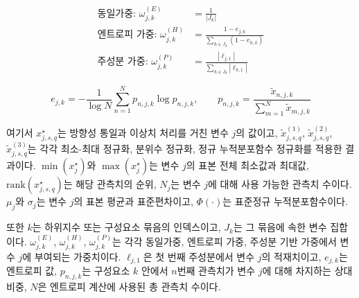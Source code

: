 \documentclass[11pt,a4paper]{report}
\begin{document}
\begin{align}
\text{동일가중: } \omega_{j,k}^{(E)} &= \frac{1}{|J_k|} \\
\text{엔트로피 가중: } \omega_{j,k}^{(H)} &= \frac{1-e_{j,k}}{\sum_{h \in J_k}(1-e_{h,k})} \\
\text{주성분 가중: } \omega_{j,k}^{(P)} &= \frac{|\ell_{j,1}|}{\sum_{h \in J_k}|\ell_{h,1}|} \label{eq:cpii_weight_methods}
\end{align}

\begin{equation}
\label{eq:cpii_entropy_weight}
e_{j,k} = -\frac{1}{\log N}\sum_{n=1}^{N} p_{n,j,k}\log p_{n,j,k}, \qquad p_{n,j,k}=\frac{\widetilde{x}_{n,j,k}}{\sum_{m=1}^{N}\widetilde{x}_{m,j,k}}
\end{equation}

여기서 $x^{\star}_{j,s,q}$는 방향성 통일과 이상치 처리를 거친 변수 $j$의 값이고, $\widetilde{x}^{(1)}_{j,s,q}$, $\widetilde{x}^{(2)}_{j,s,q}$, $\widetilde{x}^{(3)}_{j,s,q}$는 각각 최소-최대 정규화, 분위수 정규화, 정규 누적분포함수 정규화를 적용한 결과이다. $\min(x^{\star}_{j})$와 $\max(x^{\star}_{j})$는 변수 $j$의 표본 전체 최소값과 최대값, $\mathrm{rank}(x^{\star}_{j,s,q})$는 해당 관측치의 순위, $N_j$는 변수 $j$에 대해 사용 가능한 관측치 수이다. $\mu_j$와 $\sigma_j$는 변수 $j$의 표본 평균과 표준편차이고, $\Phi(\cdot)$는 표준정규 누적분포함수이다.

또한 $k$는 하위지수 또는 구성요소 묶음의 인덱스이고, $J_k$는 그 묶음에 속한 변수 집합이다. $\omega_{j,k}^{(E)}$, $\omega_{j,k}^{(H)}$, $\omega_{j,k}^{(P)}$는 각각 동일가중, 엔트로피 가중, 주성분 기반 가중에서 변수 $j$에 부여되는 가중치이다. $\ell_{j,1}$은 첫 번째 주성분에서 변수 $j$의 적재치이고, $e_{j,k}$는 엔트로피 값, $p_{n,j,k}$는 구성요소 $k$ 안에서 $n$번째 관측치가 변수 $j$에 대해 차지하는 상대 비중, $N$은 엔트로피 계산에 사용된 총 관측치 수이다.
\end{document}
